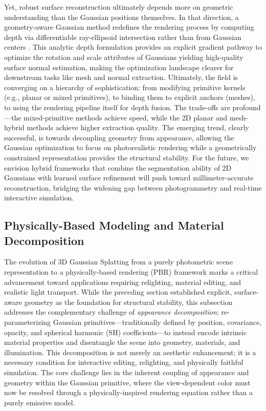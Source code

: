 \documentclass[11pt,a4paper]{article}
\begin{document}
Yet, robust surface reconstruction ultimately depends more on geometric understanding than the Gaussian positions themselves. In that direction, a geometry-aware Gaussian method redefines the rendering process by computing depth via differentiable ray-ellipsoid intersection rather than from Gaussian centers \cite{arxiv:2510.12174v2}. This analytic depth formulation provides an explicit gradient pathway to optimize the rotation and scale attributes of Gaussians yielding high-quality surface normal estimation, making the optimization landscape clearer for downstream tasks like mesh and normal extraction. Ultimately, the field is converging on a hierarchy of sophistication: from modifying primitive kernels (e.g., planar or mixed primitives), to binding them to explicit anchors (meshes), to using the rendering pipeline itself for depth fusion. The trade-offs are profound---the mixed-primitive methods achieve speed, while the 2D planar and mesh-hybrid methods achieve higher extraction quality. The emerging trend, clearly successful, is towards decoupling geometry from appearance, allowing the Gaussian optimization to focus on photorealistic rendering while a geometrically constrained representation provides the structural stability. For the future, we envision hybrid frameworks that combine the segmentation ability of 2D Gaussians with learned surface refinement will push toward millimeter-accurate reconstruction, bridging the widening gap between photogrammetry and real-time interactive simulation.


\subsection{Physically-Based Modeling and Material Decomposition}


The evolution of 3D Gaussian Splatting from a purely photometric scene representation to a physically-based rendering (PBR) framework marks a critical advancement toward applications requiring relighting, material editing, and realistic light transport. While the preceding section established explicit, surface-aware geometry as the foundation for structural stability, this subsection addresses the complementary challenge of \emph{appearance decomposition}: re-parameterizing Gaussian primitives---traditionally defined by position, covariance, opacity, and spherical harmonic (SH) coefficients---to instead encode intrinsic material properties and disentangle the scene into geometry, materials, and illumination. This decomposition is not merely an aesthetic enhancement; it is a necessary condition for interactive editing, relighting, and physically faithful simulation. The core challenge lies in the inherent coupling of appearance and geometry within the Gaussian primitive, where the view-dependent color must now be resolved through a physically-inspired rendering equation rather than a purely emissive model.
\end{document}
